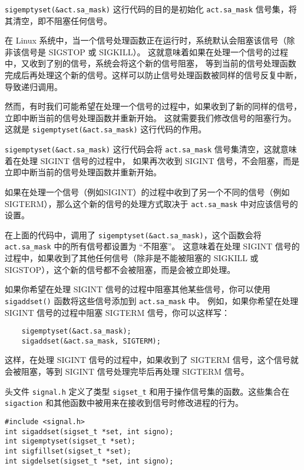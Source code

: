 \documentclass{ctexart}
\begin{document}
\verb|sigemptyset(&act.sa_mask)| 这行代码的目的是初始化 \verb|act.sa_mask| 信号集，将其清空，即不阻塞任何信号。

在 Linux 系统中，当一个信号处理函数正在运行时，系统默认会阻塞该信号（除非该信号是 SIGSTOP 或 SIGKILL）。
这就意味着如果在处理一个信号的过程中，又收到了别的信号，系统会将这个新的信号阻塞，
等到当前的信号处理函数完成后再处理这个新的信号。这样可以防止信号处理函数被同样的信号反复中断，导致递归调用。

然而，有时我们可能希望在处理一个信号的过程中，如果收到了新的同样的信号，立即中断当前的信号处理函数并重新开始。
这就需要我们修改信号的阻塞行为。这就是 \verb|sigemptyset(&act.sa_mask)| 这行代码的作用。

\verb|sigemptyset(&act.sa_mask)| 这行代码会将 \verb|act.sa_mask| 信号集清空，这就意味着在处理 SIGINT 信号的过程中，
如果再次收到 SIGINT 信号，不会阻塞，而是立即中断当前的信号处理函数并重新开始。

如果在处理一个信号（例如SIGINT）的过程中收到了另一个不同的信号（例如SIGTERM），那么这个新的信号的处理方式取决于 \verb|act.sa_mask| 中对应该信号的设置。

在上面的代码中，调用了 \verb|sigemptyset(&act.sa_mask)|，这个函数会将 \verb|act.sa_mask| 中的所有信号都设置为 ``不阻塞''。
这意味着在处理 SIGINT 信号的过程中，如果收到了其他任何信号（除非是不能被阻塞的 SIGKILL 或 SIGSTOP），这个新的信号都不会被阻塞，而是会被立即处理。

如果你希望在处理 SIGINT 信号的过程中阻塞其他某些信号，你可以使用 \verb|sigaddset()| 函数将这些信号添加到 \verb|act.sa_mask| 中。
例如，如果你希望在处理 SIGINT 信号的过程中阻塞 SIGTERM 信号，你可以这样写：

\begin{verbatim}
    sigemptyset(&act.sa_mask);
    sigaddset(&act.sa_mask, SIGTERM);
\end{verbatim}

这样，在处理 SIGINT 信号的过程中，如果收到了 SIGTERM 信号，这个信号就会被阻塞，等到 SIGINT 信号处理完毕后再处理 SIGTERM 信号。

头文件 \texttt{signal.h} 定义了类型 \texttt{sigset\_t} 和用于操作信号集的函数。这些集合在 \texttt{sigaction} 和其他函数中被用来在接收到信号时修改进程的行为。  
  
\begin{verbatim}  
#include <signal.h>  
int sigaddset(sigset_t *set, int signo);  
int sigemptyset(sigset_t *set);  
int sigfillset(sigset_t *set);  
int sigdelset(sigset_t *set, int signo);  
\end{verbatim}  
  
\end{document}
